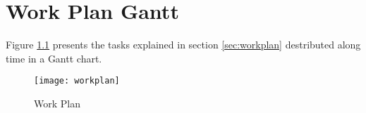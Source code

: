 \chapter{Work Plan Gantt}
\label{ann:work_plan_gantt}

Figure \ref{fig:work_plan} presents the tasks explained in section \ref{sec:workplan} destributed along time in a Gantt chart.

\begin{figure}[htbp]
	\centerline{\texttt{[image: workplan]}}%
	\caption{Work Plan}
	\label{fig:work_plan}
\end{figure}